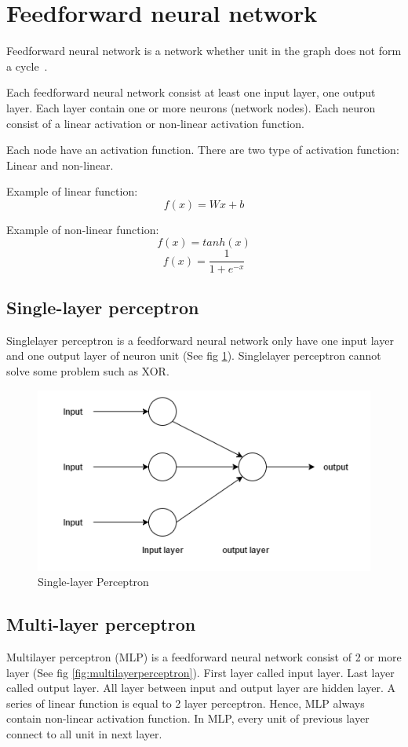 \section{Feedforward neural network}
Feedforward neural network is a network whether unit in the graph does not form a cycle~\cite{deeplearning-book}.

Each feedforward neural network consist at least one input layer, one output layer. Each layer contain one or more neurons (network nodes). Each neuron consist of a linear activation or non-linear activation function.

Each node have an activation function. There are two type of activation function: Linear and non-linear.

Example of linear function: \\

\begin{equation} \label{eq:linearmlp}
{f(x) = Wx + b }
\end{equation}

Example of non-linear function: \\
\[f(x) = tanh(x) \]
\[f(x) =\frac{1}{1+e^{-x}} \]

\subsection{Single-layer perceptron}
Singlelayer perceptron is a feedforward neural network only have one input layer and one output layer of neuron unit (See fig \ref{fig:singleperceptron}). Singlelayer perceptron cannot solve some problem such as XOR.
\begin{figure}[H]
	\centering
	\includegraphics[width=0.7\linewidth]{figure/singleperceptron}
	\caption[Single-layer Perceptron]{Single-layer Perceptron}
	\label{fig:singleperceptron}
\end{figure}



\subsection{Multi-layer perceptron}
Multilayer perceptron (MLP) is a feedforward neural network consist of 2 or more layer (See fig \ref{fig:multilayerperceptron}). First layer called input layer. Last layer called output layer. All layer between input and output layer are hidden layer. A series of linear function is equal to 2 layer perceptron. Hence, MLP always contain non-linear activation function. In MLP, every unit of previous layer connect to all unit in next layer.

